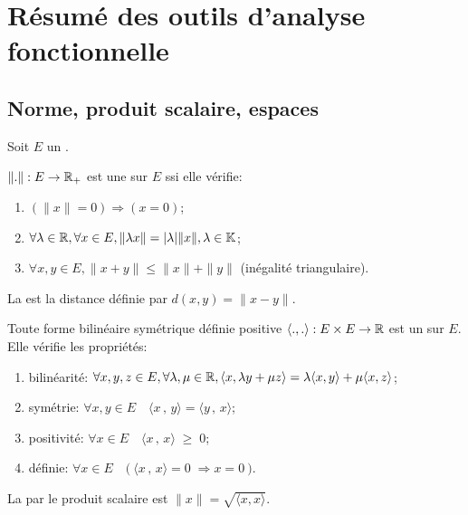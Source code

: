 \chapter*{Résumé des outils d'analyse fonctionnelle}

\section*{Norme, produit scalaire, espaces}

Soit $E$ un .

\medskip
$\|.\|: E\rightarrow \mathbb R_+$ est une  sur $E$ ssi elle vérifie:
\begin{enumerate}
   \item $(\|x\|=0) \Longrightarrow (x=0)$;
   \item $\forall\lambda\in\mathbb R, \forall x\in E, \|\lambda x\|=|\lambda|\| x\|, \lambda\in\mathbb K$;
   \item $\forall x,y\in E, \|x+y\|\le\|x\|+\|y\|$ (inégalité triangulaire).
\end{enumerate}

La  est la distance définie par $d(x,y)=\|x-y\|$.

\medskip
Toute forme bilinéaire symétrique définie positive 
$\langle.,.\rangle: E\times E\rightarrow\mathbb R$ est un   sur $E$.
Elle vérifie les propriétés:
\begin{enumerate}
   \item bilinéarité: $\forall x,y,z\in E, \forall\lambda,\mu\in\mathbb R, \langle x,\lambda y+\mu z\rangle
=\lambda\langle x,y\rangle+\mu\langle x,z\rangle$;
   \item symétrie: $\forall x,y \in E \quad \langle x\, , \, y \rangle = \langle y\, , \, x\rangle$;
   \item positivité: $\forall x \in E \quad \langle x\, , \, x \rangle \; \ge \; 0$;
   \item définie: $\forall x \in E \quad \big(\ \langle x\, , \, x \rangle = 0 \; \Rightarrow x = 0\ \big)$.
\end{enumerate}

La  par le produit scalaire est $\|x\|=\sqrt{\langle x,x\rangle}$.

